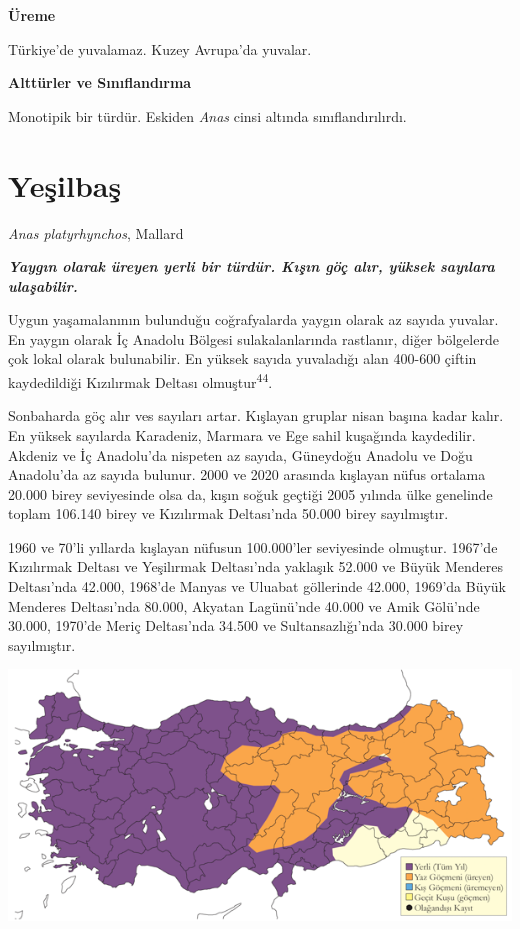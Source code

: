 \documentclass[
  letterpaper,
  DIV=11,
  numbers=noendperiod]{scrreprt}
\begin{document}
\textbf{Üreme}

Türkiye'de yuvalamaz. Kuzey Avrupa'da yuvalar.

\textbf{Alttürler ve Sınıflandırma}

Monotipik bir türdür. Eskiden \emph{Anas} cinsi altında
sınıflandırılırdı.

\section{Yeşilbaş}\label{yeux15filbaux15f}

\emph{Anas platyrhynchos}, Mallard

\textbf{\emph{Yaygın olarak üreyen yerli bir türdür. Kışın göç alır,
yüksek sayılara ulaşabilir.}}

Uygun yaşamalanının bulunduğu coğrafyalarda yaygın olarak az sayıda
yuvalar. En yaygın olarak İç Anadolu Bölgesi sulakalanlarında rastlanır,
diğer bölgelerde çok lokal olarak bulunabilir. En yüksek sayıda
yuvaladığı alan 400-600 çiftin kaydedildiği Kızılırmak Deltası
olmuştur\textsuperscript{44}.

Sonbaharda göç alır ves sayıları artar. Kışlayan gruplar nisan başına
kadar kalır. En yüksek sayılarda Karadeniz, Marmara ve Ege sahil
kuşağında kaydedilir. Akdeniz ve İç Anadolu'da nispeten az sayıda,
Güneydoğu Anadolu ve Doğu Anadolu'da az sayıda bulunur. 2000 ve 2020
arasında kışlayan nüfus ortalama 20.000 birey seviyesinde olsa da, kışın
soğuk geçtiği 2005 yılında ülke genelinde toplam 106.140 birey ve
Kızılırmak Deltası'nda 50.000 birey sayılmıştır.

1960 ve 70'li yıllarda kışlayan nüfusun 100.000'ler seviyesinde
olmuştur. 1967'de Kızılırmak Deltası ve Yeşilırmak Deltası'nda yaklaşık
52.000 ve Büyük Menderes Deltası'nda 42.000, 1968'de Manyas ve Uluabat
göllerinde 42.000, 1969'da Büyük Menderes Deltası'nda 80.000, Akyatan
Lagünü'nde 40.000 ve Amik Gölü'nde 30.000, 1970'de Meriç Deltası'nda
34.500 ve Sultansazlığı'nda 30.000 birey sayılmıştır.

\includegraphics{images/harita_Page_016.png}
\end{document}
